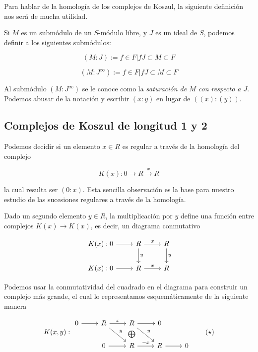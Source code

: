 Para hablar de la homología de los complejos de Koszul, la siguiente definición nos será de mucha utilidad.

\begin{definition}

Si $M$ es un submódulo de un $S$-módulo libre, y $J$ es un ideal de $S$, podemos definir a los siguientes submódulos:

$$(M:J) := {f \in F|fJ\subset M}\subset F$$

$$(M:J^\infty) := {f \in F|fJ\subset M}\subset F$$

Al submódulo $(M:J^\infty)$ se le conoce como la \emph{saturación de $M$ con respecto a $J$}. Podemos abusar de la notación y escribir $(x:y)$ en lugar de $((x):(y))$.

\end{definition}

\subsection{Complejos de Koszul de longitud 1 y 2}

Podemos decidir si un elemento $x \in R$ es regular a través de la homología del complejo

$$ K(x):0\rightarrow R\xrightarrow{x} R $$

la cual resulta ser $(0:x)$. Esta sencilla observación es la base para nuestro estudio de las sucesiones regulares a través de la homología.

Dado un segundo elemento $y \in R$, la multiplicación por $y$ define una función entre complejos $K(x)\rightarrow K(x)$, es decir, un diagrama conmutativo

\[
\begin{tikzcd}
K(x):0 \arrow[r,""] & R \arrow[r,"x"] \arrow[d,"y"] & R \arrow[d,"y"]\\
K(x):0 \arrow[r,""] & R \arrow[r,"x"] & R
\end{tikzcd}
\]

Podemos usar la conmutatividad del cuadrado en el diagrama para construir un complejo más grande, el cual lo representamos esquemáticamente de la siguiente manera

\[
K(x,y):
\begin{tikzcd}
0\arrow[r,""] & R \arrow[r,"x"] \arrow[rd,"y"] & R \arrow[d,draw=none,"\bigoplus" description] \arrow[r,""] \arrow[rd,"y"] & 0\\
&0 \arrow[r,""] & R \arrow[r,"-x"] & R \arrow[r] & 0
\end{tikzcd} \label{complex2schema} \tag{$\star$}
\]

